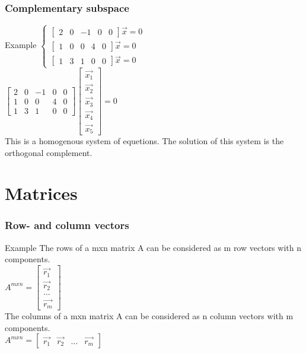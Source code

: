 \begin{frame}
	\frametitle{Complementary subspace}
	\begin{block}{Example}
		$\begin{cases}
		\begin{bmatrix} 2 & 0 & -1 & 0 & 0 \end{bmatrix} \overrightarrow{x}=0\\
		\begin{bmatrix} 1 & 0 & 0 & 4 & 0 \end{bmatrix} \overrightarrow{x}=0\\
		\begin{bmatrix} 1 & 3 & 1 & 0 & 0 \end{bmatrix} \overrightarrow{x}=0
		\end{cases}$\\
		$\begin{bmatrix} 
		2 & 0 & -1 & 0 & 0\\
		1 & 0 & 0 & 4 & 0\\
		1 & 3 & 1 & 0 & 0
		\end{bmatrix} 
		\begin{bmatrix}
		\overrightarrow{x_1}\\ \overrightarrow{x_2}\\ \overrightarrow{x_3}\\ \overrightarrow{x_4}\\ \overrightarrow{x_5}
		\end{bmatrix}=0$\\
		This is a homogenous system of equetions. The solution of this system is the orthogonal complement. 	
	\end{block}
\end{frame}


\section{Matrices}

\begin{frame}
	\frametitle{Row- and column vectors}
	\begin{block}{Example}
		The rows of a mxn matrix A can be considered as m row vectors with n components.\\
		$A^{mxn}=\begin{bmatrix} \overrightarrow{r_1}\\ \overrightarrow{r_2}\\ ...\\\overrightarrow{r_m}\end{bmatrix}$\\
		The columns of a mxn matrix A can be considered as n column vectors with m components.\\
		$A^{mxn}=\begin{bmatrix} \overrightarrow{r_1}& \overrightarrow{r_2}& ...& \overrightarrow{r_m}\end{bmatrix}$
	\end{block}
\end{frame}

